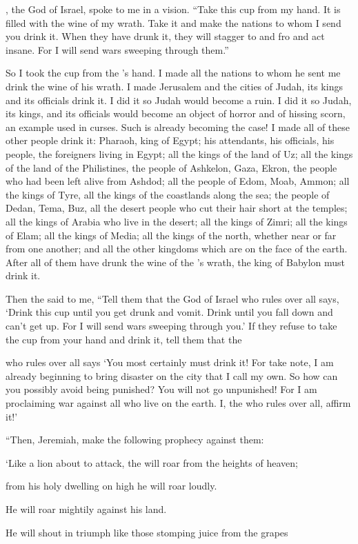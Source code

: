 {{},
the God
of Israel,
spoke to
me in a vision. “Take
this cup
from my hand.
It is filled with the wine
of my wrath.
Take it and make the
nations
to
whom
I
send
you drink it.
When they have drunk
it, they will stagger to and fro
and act insane.
For I
will send
wars
sweeping through them.”
\par }{\PP {}So I took
the
cup
from the
{}’s
hand.
I made all
the nations
to whom
he sent
me
drink the wine of his wrath.
I made Jerusalem
and the
cities
of Judah,
its
kings
and its officials
drink it. I did
it so Judah would become a ruin.
I did it so Judah, its kings, and its officials would become an object of horror
and of hissing scorn,
an example used in curses.
Such is already becoming the case!
I made all
of these other people
drink it: Pharaoh,
king
of Egypt;
his attendants,
his officials, his people,
the
foreigners living in Egypt;
all
the kings
of the land
of Uz;
all
the kings
of the land
of the Philistines,
the
people of Ashkelon,
Gaza,
Ekron,
the
people who had been left alive
from Ashdod;
all the people of Edom,
Moab,
Ammon;
all
the kings
of Tyre,
all the kings
of the coastlands
along the sea;
the people of Dedan,
Tema,
Buz,
all
the desert people who cut their hair short
at the temples;
all
the kings
of Arabia
who
live
in the desert;
all
the kings
of Zimri;
all
the kings
of Elam;
all
the kings
of Media;
all
the kings
of the north,
whether near
or far
from one
another;
and all
the other kingdoms
which
are on
the face
of the earth.
After
all of them have drunk the wine of the
{}’s wrath,
the king
of Babylon
must drink it.
\par }{\PP {}Then the
{} said
to me, “Tell
them that the
{}
God
of Israel
who rules over all
says, ‘Drink
this cup until you get drunk
and vomit.
Drink until you fall
down and can’t
get
up. For I
will send
wars
sweeping through you.’
If
they refuse
to take
the cup
from your hand
and drink
it, tell
them
that the

{}
who rules over all
says ‘You most certainly must
drink it!
For
take note,
I am
already beginning
to bring disaster on the city
that
I call
my own.
So
how can you
possibly avoid
being punished? You
will not
go unpunished! For
I am
proclaiming
war
against
all
who live
on the earth.
I, the
{}
who rules over all,
affirm it!’
\par }{\PP {}“Then, Jeremiah, make the following prophecy
against
them:
\par }{\Q ‘Like a lion about to
attack, the
{}
will roar
from the heights
of heaven;
\par }{\Q from his holy
dwelling
on high he will roar loudly.
\par }{\Q He will roar mightily
against
his land.
\par }{\Q He will shout in triumph
like those stomping
juice from the grapes

}
